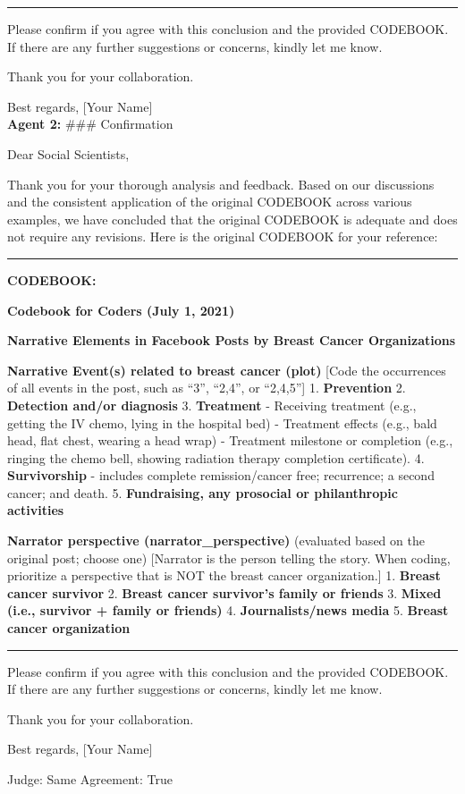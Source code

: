 \begin{center}\rule{0.5\linewidth}{0.5pt}\end{center}

Please confirm if you agree with this conclusion and the provided
CODEBOOK. If there are any further suggestions or concerns, kindly let
me know.

Thank you for your collaboration.

Best regards, {[}Your Name{]}\\

\textbf{Agent 2:} \#\#\# Confirmation

Dear Social Scientists,

Thank you for your thorough analysis and feedback. Based on our
discussions and the consistent application of the original CODEBOOK
across various examples, we have concluded that the original CODEBOOK is
adequate and does not require any revisions. Here is the original
CODEBOOK for your reference:

\begin{center}\rule{0.5\linewidth}{0.5pt}\end{center}

\textbf{CODEBOOK:}

\textbf{Codebook for Coders (July 1, 2021)}

\textbf{Narrative Elements in Facebook Posts by Breast Cancer
Organizations}

\textbf{Narrative Event(s) related to breast cancer (plot)} {[}Code the
occurrences of all events in the post, such as ``3'', ``2,4'', or
``2,4,5''{]} 1. \textbf{Prevention} 2. \textbf{Detection and/or
diagnosis} 3. \textbf{Treatment} - Receiving treatment (e.g., getting
the IV chemo, lying in the hospital bed) - Treatment effects (e.g., bald
head, flat chest, wearing a head wrap) - Treatment milestone or
completion (e.g., ringing the chemo bell, showing radiation therapy
completion certificate). 4. \textbf{Survivorship} - includes complete
remission/cancer free; recurrence; a second cancer; and death. 5.
\textbf{Fundraising, any prosocial or philanthropic activities}

\textbf{Narrator perspective (narrator\_perspective)} (evaluated based
on the original post; choose one) {[}Narrator is the person telling the
story. When coding, prioritize a perspective that is NOT the breast
cancer organization.{]} 1. \textbf{Breast cancer survivor} 2.
\textbf{Breast cancer survivor's family or friends} 3. \textbf{Mixed
(i.e., survivor + family or friends)} 4. \textbf{Journalists/news media}
5. \textbf{Breast cancer organization}

\begin{center}\rule{0.5\linewidth}{0.5pt}\end{center}

Please confirm if you agree with this conclusion and the provided
CODEBOOK. If there are any further suggestions or concerns, kindly let
me know.

Thank you for your collaboration.

Best regards, {[}Your Name{]}

Judge: Same Agreement: True